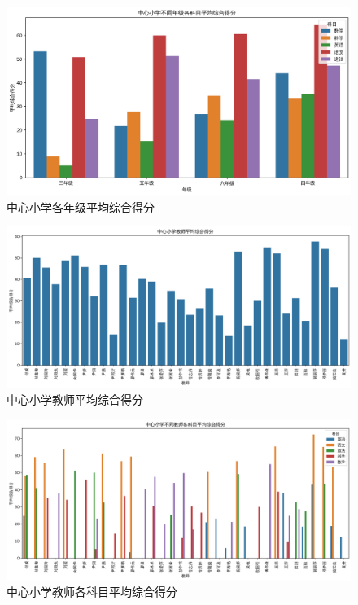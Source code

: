 \documentclass{article}
\begin{document}
\begin{figure}[H]
    \centering
    \includegraphics[width=1\textwidth]{fig/7.png}
    \caption{中心小学各年级平均综合得分}
\end{figure}

\begin{figure}[H]
    \centering
    \includegraphics[width=1\textwidth]{fig/8.png}
    \caption{中心小学教师平均综合得分}
\end{figure}

\begin{figure}[H]
    \centering
    \includegraphics[width=1\textwidth]{fig/9.png}
    \caption{中心小学教师各科目平均综合得分}
\end{figure}


% 
% 
\end{document}
